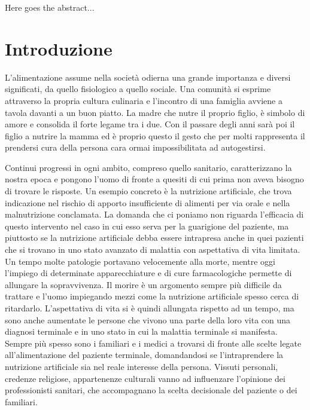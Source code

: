 \documentclass[12pt,a4paper,oneside]{book}
\begin{document}
Here goes the abstract...



\chapter*{Introduzione}
L'alimentazione assume nella societ\`a odierna una grande importanza e diversi significati, da quello fisiologico a quello sociale. Una comunit\`a si esprime attraverso la propria cultura culinaria e l'incontro di una famiglia avviene a tavola davanti a un buon piatto. La madre che nutre il proprio figlio, \`e simbolo di amore e consolida il forte legame tra i due. Con il passare degli anni sar\`a poi il figlio a nutrire la mamma ed \`e proprio questo il gesto che per molti rappresenta il prendersi cura della persona cara ormai impossibilitata ad autogestirsi. 

Continui progressi in ogni ambito, compreso quello sanitario, caratterizzano la nostra epoca e pongono l'uomo di fronte a quesiti di cui prima non aveva bisogno di trovare le risposte. Un esempio concreto \`e la nutrizione artificiale, che trova indicazione nel rischio di apporto insufficiente di alimenti per via orale e nella malnutrizione conclamata. 
La domanda che ci poniamo non riguarda l'efficacia di questo intervento nel caso in cui esso serva per la guarigione del paziente, ma piuttosto se la nutrizione artificiale debba essere intrapresa anche in quei pazienti che si trovano in uno stato avanzato di malattia con aspettativa di vita limitata.
Un tempo molte patologie portavano velocemente alla morte, mentre oggi l'impiego di determinate apparecchiature e di cure farmacologiche permette di allungare la sopravvivenza. Il morire \`e un argomento sempre pi\`u difficile da trattare e l'uomo impiegando mezzi come la nutrizione artificiale spesso cerca di ritardarlo. L'aspettativa di vita si \`e quindi allungata rispetto ad un tempo, ma sono anche aumentate le persone che vivono una parte della loro vita con una diagnosi terminale e in uno stato in cui la malattia terminale si manifesta. 
Sempre pi\`u spesso sono i familiari e i medici a trovarsi di fronte alle scelte legate all'alimentazione del paziente terminale, domandandosi se l'intraprendere la nutrizione artificiale sia nel reale interesse della persona. Vissuti personali, credenze religiose, appartenenze culturali vanno ad influenzare l'opinione dei professionisti sanitari, che accompagnano la scelta decisionale del paziente o dei familiari. 
\end{document}
